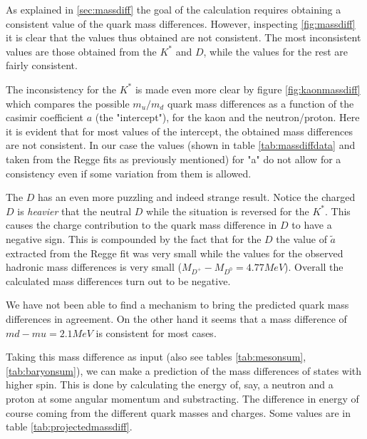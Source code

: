 \documentclass[11pt,a4paper]{article}
\begin{document}
As explained in \ref{sec:massdiff} the goal of the calculation requires obtaining a consistent value of the quark mass differences. However, inspecting \ref{fig:massdiff} it is clear that the values thus obtained are not consistent. The most inconsistent values are those obtained from the $K^{*}$ and $D$, while the values for the rest are fairly consistent. 

The inconsistency for the $K^{*}$ is made even more clear by figure \ref{fig:kaonmassdiff} which compares the possible $m_u/m_d$ quark mass differences as a function of the casimir coefficient $a$ (the "intercept"), for the kaon and the neutron/proton. Here it is evident that for most values of the intercept, the obtained mass differences are not consistent. In our case the values (shown in table \ref{tab:massdiffdata} and taken from the Regge fits as previously mentioned) for "a" do not allow for a consistency even if some variation from them is allowed.

The $D$ has an even more puzzling and indeed strange result. Notice the charged $D$ is \emph{heavier} that the neutral $D$ while the situation is reversed for the $K^{*}$. This causes the charge contribution to the quark mass difference in $D$ to have a negative sign. This is compounded by the fact that for the $D$ the value of $\tilde{a}$ extracted from the Regge fit was very small while the values for the observed hadronic mass differences is very small ($M_{D^{+}}-M_{D^{0}}=4.77 MeV$). Overall the calculated mass differences turn out to be negative.

We have not been able to find a mechanism to bring the predicted quark mass differences in agreement. On the other hand it seems that a mass difference of $md-mu=2.1 MeV$ is consistent for most cases.

Taking this mass difference as input (also see tables \ref{tab:mesonsum},\ref{tab:baryonsum}), we can make a prediction of the mass differences of states with higher spin. This is done by calculating the energy of, say, a neutron and a proton at some angular momentum and substracting. The difference in energy of course coming from the different quark masses and charges. Some values are in table \ref{tab:projectedmassdiff}.
\end{document}
